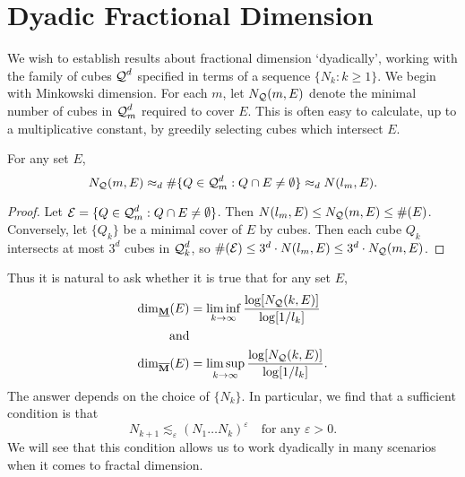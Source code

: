 \section{Dyadic Fractional Dimension}

We wish to establish results about fractional dimension `dyadically', working with the family of cubes $\operatorname{\mathcal{Q}}^d$ specified in terms of a sequence $\{ N_k : k \geq 1 \}$. We begin with Minkowski dimension. For each $m$, let $N_{\operatorname{\mathcal{Q}}}(m,E)$ denote the minimal number of cubes in $\operatorname{\mathcal{Q}}_m^d$ required to cover $E$. This is often easy to calculate, up to a multiplicative constant, by greedily selecting cubes which intersect $E$.

\begin{lemma} \label{comparableCovers}
	For any set $E$,
	\[ N_{\operatorname{\mathcal{Q}}}(m,E) \approx_d \# \{ Q \in \operatorname{\mathcal{Q}}_m^d : Q \cap E \neq \emptyset \} \approx_d N(l_m,E). \]
\end{lemma}
\begin{proof}
	Let $\mathcal{E} = \{ Q \in \operatorname{\mathcal{Q}}_m^d : Q \cap E \neq \emptyset \}$. Then $N(l_m,E) \leq N_{\operatorname{\mathcal{Q}}}(m,E) \leq \#(E)$. Conversely, let $\{ Q_k \}$ be a minimal cover of $E$ by cubes. Then each cube $Q_k$ intersects at most $3^d$ cubes in $\operatorname{\mathcal{Q}}_k^d$, so $\#(\mathcal{E}) \leq 3^d \cdot N(l_m,E) \leq 3^d \cdot N_{\operatorname{\mathcal{Q}}}(m,E)$.
\end{proof}

Thus it is natural to ask whether it is true that for any set $E$,
%
\begin{equation} \label{definingSequence}
	\begin{aligned}
		\operatorname{\dim_{\underline{\mathbf{M}}}}(E) &= \liminf_{k \to \infty} \frac{\log[N_{\operatorname{\mathcal{Q}}}(k,E)]}{\log[1/l_k]}\\
		\text{and}\\
		\operatorname{\dim_{\overline{\mathbf{M}}}}(E) &= \limsup_{k \to \infty} \frac{\log[N_{\operatorname{\mathcal{Q}}}(k,E)]}{\log[1/l_k]}.
	\end{aligned}
\end{equation}
%
The answer depends on the choice of $\{ N_k \}$. In particular, we find that a sufficient condition is that
%
\begin{equation} \label{definingsequencegrowthrate}
	N_{k+1} \lesssim_\varepsilon (N_1 \dots N_k)^\varepsilon \quad \text{for any $\varepsilon > 0$}.
\end{equation}
%
We will see that this condition allows us to work dyadically in many scenarios when it comes to fractal dimension.

%
%

